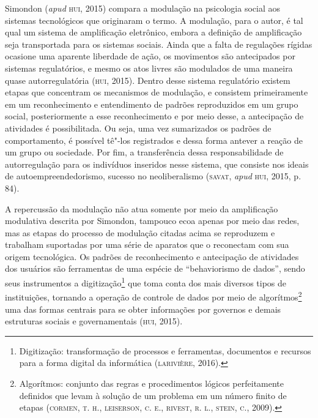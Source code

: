 Simondon (\emph{apud} \textsc{hui}, 2015) compara a modulação na psicologia social
aos sistemas tecnológicos que originaram o termo. A modulação, para o
autor, é tal qual um sistema de amplificação eletrônico, embora a
definição de amplificação seja transportada para os sistemas sociais.
Ainda que a falta de regulações rígidas ocasione uma aparente liberdade
de ação, os movimentos são antecipados por sistemas regulatórios, e
mesmo os atos livres são modulados de uma maneira quase autorregulatória
(\textsc{hui}, 2015). Dentro desse sistema regulatório existem etapas que
concentram os mecanismos de modulação, e consistem primeiramente em um
reconhecimento e entendimento de padrões reproduzidos em um grupo
social, posteriormente a esse reconhecimento e por meio desse, a
antecipação de atividades é possibilitada. Ou seja, uma vez sumarizados
os padrões de comportamento, é possível tê"-los registrados e dessa forma
antever a reação de um grupo ou sociedade. Por fim, a transferência
dessa responsabilidade de autorregulação para os indivíduos inseridos
nesse sistema, que consiste nos ideais de autoempreendedorismo, sucesso
no neoliberalismo (\textsc{savat}, \emph{apud} \textsc{hui}, 2015, p. 84).

A repercussão da modulação não atua somente por meio da amplificação
modulativa descrita por Simondon, tampouco ecoa apenas por meio das
redes, mas as etapas do processo de modulação citadas acima se
reproduzem e trabalham suportadas por uma série de aparatos que o
reconectam com sua origem tecnológica. Os padrões de reconhecimento e
antecipação de atividades dos usuários são ferramentas de uma espécie de
``behaviorismo de dados'', sendo seus instrumentos a
digitização\footnote{Digitização: transformação de processos e
  ferramentas, documentos e recursos para a forma digital da informática
  (\textsc{larivière}, 2016).} que toma conta dos mais diversos tipos de
instituições, tornando a operação de controle de dados por meio de
algorítmos\footnote{Algorítmos: conjunto das regras e procedimentos
  lógicos perfeitamente definidos que levam à solução de um problema em
  um número finito de etapas (\textsc{cormen, t. h.}, \textsc{leiserson, c. e.}, \textsc{rivest,
  r. l.}, \textsc{stein, c.}, 2009).} uma das formas centrais para se obter
informações por governos e demais estruturas sociais e governamentais
(\textsc{hui}, 2015).

